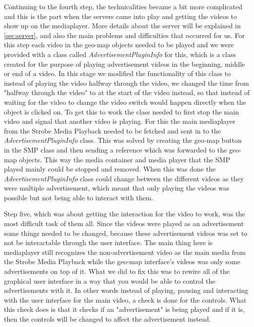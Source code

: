 Continuing to the fourth step, the technicalities became a bit more complicated and this is the part when the servers came into play and getting the videos to show up on the mediaplayer. More details about the server will be explained in \ref{sec:server}, and also the main problems and difficulties that occurred for us. For this step each video in the geo-map objects needed to be played and we were provided with a class called   \textit{AdvertisementPluginInfo} for this, which is a class created for the purpose of playing advertisement videos in the beginning, middle or end of a video. In this stage we modified the functionality of this class to instead of playing the video halfway through the video, we changed the time from "halfway through the video" to at the start of the video instead, so that instead of waiting for the video to change the video switch would happen directly when the object is clicked on. To get this to work the class needed to first stop the main video and signal that another video is playing. For this the main mediaplayer from the Strobe Media Playback needed to be fetched and sent in to the \textit{AdvertisementPluginInfo} class. This was solved by creating the geo-map button in the SMP class and then sending a reference which was forwarded to the geo-map objects. This way the media container and media player that the SMP played mainly could be stopped and removed. When this was done the \textit{AdvertisementPluginInfo} class could change between the different videos as they were multiple advertisement, which meant that only playing the videos was possible but not being able to interact with them. 

Step five, which was about getting the interaction for the video to work, was the most difficult task of them all. Since the videos were played as an advertisement some things needed to be changed, because these advertisement videos was set to not be interactable through the user interface. The main thing here is mediaplayer still recognizes the non-advertisement video as the main media from the Strobe Media Playback while the geo-map interface's videos was only some advertisements on top of it. What we did to fix this was to rewire all of the graphical user interface in a way that you would be able to control the advertisements with it. In other words instead of playing, pausing and interacting with the user interface for the main video, a check is done for the controls. What this check does is that it checks if an "advertisement" is being played and if it is, then the controls will be changed to affect the advertisement instead.

